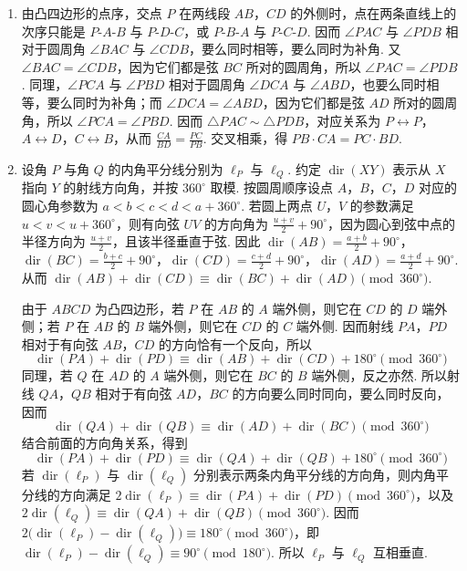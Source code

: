 \begin{solution}
\begin{enumerate}
\item 由凸四边形的点序，交点 \(P\) 在两线段 \(AB\)，\(CD\) 的外侧时，点在两条直线上的次序只能是 \(P\text{-}A\text{-}B\) 与 \(P\text{-}D\text{-}C\)，或 \(P\text{-}B\text{-}A\) 与 \(P\text{-}C\text{-}D\). 因而 \(\angle PAC\) 与 \(\angle PDB\) 相对于圆周角 \(\angle BAC\) 与 \(\angle CDB\)，要么同时相等，要么同时为补角. 又 \(\angle BAC=\angle CDB\)，因为它们都是弦 \(BC\) 所对的圆周角，所以 \(\angle PAC=\angle PDB\). 同理，\(\angle PCA\) 与 \(\angle PBD\) 相对于圆周角 \(\angle DCA\) 与 \(\angle ABD\)，也要么同时相等，要么同时为补角；而 \(\angle DCA=\angle ABD\)，因为它们都是弦 \(AD\) 所对的圆周角，所以 \(\angle PCA=\angle PBD\). 因而 \(\triangle PAC\sim\triangle PDB\)，对应关系为 \(P\leftrightarrow P\)，\(A\leftrightarrow D\)，\(C\leftrightarrow B\)，从而 \(\frac{CA}{BD}=\frac{PC}{PB}\). 交叉相乘，得 \(PB\cdot CA=PC\cdot BD\).
\item 设角 \(P\) 与角 \(Q\) 的内角平分线分别为 \(\ell_{P}\) 与 \(\ell_{Q}\). 约定 \(\operatorname{dir}(XY)\) 表示从 \(X\) 指向 \(Y\) 的射线方向角，并按 \(360^{\circ}\) 取模. 按圆周顺序设点 \(A\)，\(B\)，\(C\)，\(D\) 对应的圆心角参数为 \(a<b<c<d<a+360^{\circ}\). 若圆上两点 \(U\)，\(V\) 的参数满足 \(u<v<u+360^{\circ}\)，则有向弦 \(UV\) 的方向角为 \(\frac{u+v}{2}+90^{\circ}\)，因为圆心到弦中点的半径方向为 \(\frac{u+v}{2}\)，且该半径垂直于弦. 因此 \(\operatorname{dir}(AB)=\frac{a+b}{2}+90^{\circ}\)，\(\operatorname{dir}(BC)=\frac{b+c}{2}+90^{\circ}\)，\(\operatorname{dir}(CD)=\frac{c+d}{2}+90^{\circ}\)，\(\operatorname{dir}(AD)=\frac{a+d}{2}+90^{\circ}\). 从而 \(\operatorname{dir}(AB)+\operatorname{dir}(CD)\equiv\operatorname{dir}(BC)+\operatorname{dir}(AD)\pmod {360^{\circ}}\).

由于 \(ABCD\) 为凸四边形，若 \(P\) 在 \(AB\) 的 \(A\) 端外侧，则它在 \(CD\) 的 \(D\) 端外侧；若 \(P\) 在 \(AB\) 的 \(B\) 端外侧，则它在 \(CD\) 的 \(C\) 端外侧. 因而射线 \(PA\)，\(PD\) 相对于有向弦 \(AB\)，\(CD\) 的方向恰有一个反向，所以
\[
\operatorname{dir}(PA)+\operatorname{dir}(PD)\equiv\operatorname{dir}(AB)+\operatorname{dir}(CD)+180^{\circ}\pmod {360^{\circ}}
\]
同理，若 \(Q\) 在 \(AD\) 的 \(A\) 端外侧，则它在 \(BC\) 的 \(B\) 端外侧，反之亦然. 所以射线 \(QA\)，\(QB\) 相对于有向弦 \(AD\)，\(BC\) 的方向要么同时同向，要么同时反向，因而
\[
\operatorname{dir}(QA)+\operatorname{dir}(QB)\equiv\operatorname{dir}(AD)+\operatorname{dir}(BC)\pmod {360^{\circ}}
\]
结合前面的方向角关系，得到
\[
\operatorname{dir}(PA)+\operatorname{dir}(PD)\equiv\operatorname{dir}(QA)+\operatorname{dir}(QB)+180^{\circ}\pmod {360^{\circ}}
\]
若 \(\operatorname{dir}(\ell_{P})\) 与 \(\operatorname{dir}(\ell_{Q})\) 分别表示两条内角平分线的方向角，则内角平分线的方向满足 \(2\operatorname{dir}(\ell_{P})\equiv\operatorname{dir}(PA)+\operatorname{dir}(PD)\pmod {360^{\circ}}\)，以及 \(2\operatorname{dir}(\ell_{Q})\equiv\operatorname{dir}(QA)+\operatorname{dir}(QB)\pmod {360^{\circ}}\). 因而 \(2\bigl(\operatorname{dir}(\ell_{P})-\operatorname{dir}(\ell_{Q})\bigr)\equiv180^{\circ}\pmod {360^{\circ}}\)，即 \(\operatorname{dir}(\ell_{P})-\operatorname{dir}(\ell_{Q})\equiv90^{\circ}\pmod {180^{\circ}}\). 所以 \(\ell_{P}\) 与 \(\ell_{Q}\) 互相垂直.
\end{enumerate}
\end{solution}
